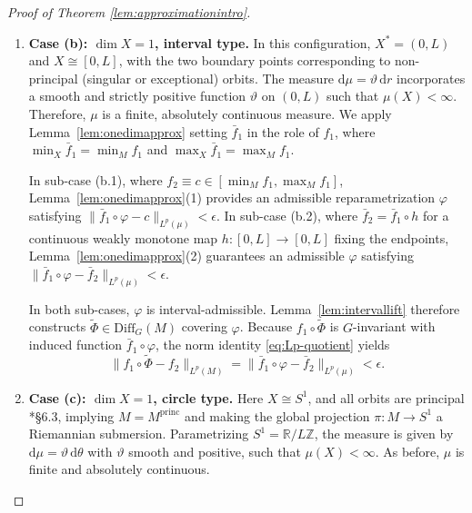\documentclass[12pt,a4paper]{amsart}
\theoremstyle{plain}
\theoremstyle{definition}
\theoremstyle{remark}
\begin{document}
\begin{proof}[Proof of Theorem \ref{lem:approximationintro}]
\begin{enumerate}[label=\textup{(\alph*)}, font=\upshape]
  By Lemma~\ref{lem:compactlift}, the compactly supported isotopy $(\bar{\Phi}_t)_{t \in [0,1]}$ lifts to a global equivariant diffeomorphism $\widetilde{\Phi} \in \mathrm{Diff}_G(M)$ covering $\bar{\Phi}$. Because $f_1 \circ \widetilde{\Phi}$ is $G$-invariant with induced function $\bar{f}_1 \circ \bar{\Phi}$, applying the norm identity \eqref{eq:Lp-quotient} and the triangle inequality concludes the case:
  \[
    \|f_1 \circ \widetilde{\Phi} - f_2\|_{L^p(M)} \le \|\bar{f}_1 \circ \bar{\Phi} - \bar{f}_{2,c}\|_{L^p(\mu)} + \|f_{2,c} - f_2\|_{L^p(M)} < \frac{\epsilon}{2} + \frac{\epsilon}{2} = \epsilon.
  \]

  \item \textbf{Case \textup{(b):} $\dim X = 1$, interval type.} In this configuration, $X^* = (0,L)$ and $X \cong [0, L]$, with the two boundary points corresponding to non-principal (singular or exceptional) orbits. The measure $\mathrm{d}\mu = \vartheta\,\mathrm{d}r$ incorporates a smooth and strictly positive function $\vartheta$ on $(0,L)$ such that $\mu(X) < \infty$. Therefore, $\mu$ is a finite, absolutely continuous measure. We apply Lemma~\ref{lem:onedimapprox} setting $\bar{f}_1$ in the role of $f_1$, where $\min_X \bar{f}_1 = \min_M f_1$ and $\max_X \bar{f}_1 = \max_M f_1$.

  In sub-case \textup{(b.1)}, where $f_2 \equiv c \in [\min_M f_1, \max_M f_1]$, Lemma~\ref{lem:onedimapprox}(1) provides an admissible reparametrization $\varphi$ satisfying $\|\bar{f}_1 \circ \varphi - c\|_{L^p(\mu)} < \epsilon$. In sub-case \textup{(b.2)}, where $\bar{f}_2 = \bar{f}_1 \circ h$ for a continuous weakly monotone map $h \colon [0,L] \to [0,L]$ fixing the endpoints, Lemma~\ref{lem:onedimapprox}(2) guarantees an admissible $\varphi$ satisfying $\|\bar{f}_1 \circ \varphi - \bar{f}_2\|_{L^p(\mu)} < \epsilon$.

  In both sub-cases, $\varphi$ is interval-admissible. Lemma~\ref{lem:intervallift} therefore constructs $\widetilde{\Phi} \in \mathrm{Diff}_G(M)$ covering $\varphi$. Because $f_1 \circ \widetilde{\Phi}$ is $G$-invariant with induced function $\bar{f}_1 \circ \varphi$, the norm identity \eqref{eq:Lp-quotient} yields
  \[
    \|f_1 \circ \widetilde{\Phi} - f_2\|_{L^p(M)} = \|\bar{f}_1 \circ \varphi - \bar{f}_2\|_{L^p(\mu)} < \epsilon.
  \]

  \medskip
  \item \textbf{Case \textup{(c):} $\dim X = 1$, circle type.} Here $X \cong S^1$, and all orbits are principal \cite{alexandrino2015lie}*{\S 6.3}, implying $M = M^{\mathrm{princ}}$ and making the global projection $\pi \colon M \to S^1$ a Riemannian submersion. Parametrizing $S^1 = \mathbb{R}/L\mathbb{Z}$, the measure is given by $\mathrm{d}\mu = \vartheta\,\mathrm{d}\theta$ with $\vartheta$ smooth and positive, such that $\mu(X) < \infty$. As before, $\mu$ is finite and absolutely continuous.


\end{enumerate}
\end{proof}
\end{document}
